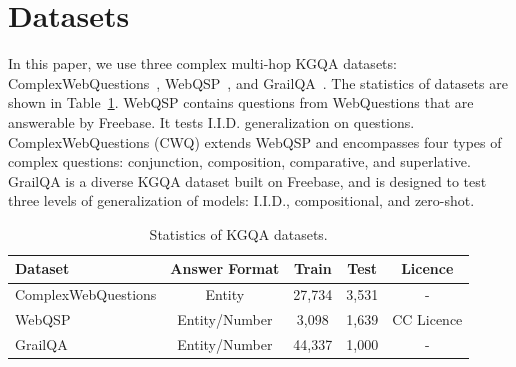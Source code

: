 \documentclass{article}
\begin{document}
\section{Datasets}
\label{apx:dataset}
In this paper, we use three complex multi-hop KGQA datasets: ComplexWebQuestions~\cite{talmor2018web}, WebQSP~\cite{yih2016value}, and GrailQA~\cite{gu2021beyond}. The statistics of datasets are shown in Table~\ref{Tab:dataset}.
WebQSP contains questions from WebQuestions that are answerable by Freebase. It tests I.I.D. generalization on questions.
ComplexWebQuestions (CWQ) extends WebQSP and encompasses four types of complex questions: conjunction, composition, comparative, and superlative.
GrailQA is a diverse KGQA dataset built on Freebase, and is designed to test three levels of generalization of models: I.I.D., compositional, and zero-shot.
\begin{table}[ht]
\centering
\caption{Statistics of KGQA datasets.}
\begin{tabular}{lcccc} 
    \toprule
    \textbf{Dataset} & \textbf{Answer Format} & \textbf{Train} & \textbf{Test} & \textbf{Licence}\\
    \midrule  
     ComplexWebQuestions & Entity & 27,734 & 3,531& - \\
     WebQSP & Entity/Number & 3,098 & 1,639 & CC Licence \\
     GrailQA & Entity/Number & 44,337 & 1,000 & - \\
    \bottomrule
\end{tabular}
\label{Tab:dataset}
\end{table}
\end{document}
